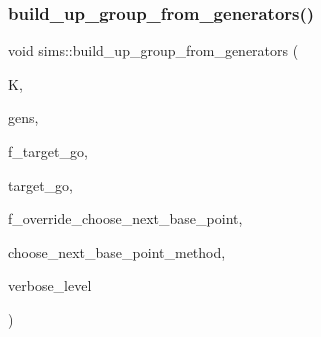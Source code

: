 \subsubsection{\texorpdfstring{build\+\_\+up\+\_\+group\+\_\+from\+\_\+generators()}{build\_up\_group\_from\_generators()}}
{\footnotesize\ttfamily void sims\+::build\+\_\+up\+\_\+group\+\_\+from\+\_\+generators (\begin{DoxyParamCaption}\item[{\mbox{\hyperlink{classsims}{sims}} $\ast$}]{K,  }\item[{\mbox{\hyperlink{classvector__ge}{vector\+\_\+ge}} $\ast$}]{gens,  }\item[{\mbox{\hyperlink{galois_8h_a09fddde158a3a20bd2dcadb609de11dc}{I\+NT}}}]{f\+\_\+target\+\_\+go,  }\item[{\mbox{\hyperlink{classlonginteger__object}{longinteger\+\_\+object}} $\ast$}]{target\+\_\+go,  }\item[{\mbox{\hyperlink{galois_8h_a09fddde158a3a20bd2dcadb609de11dc}{I\+NT}}}]{f\+\_\+override\+\_\+choose\+\_\+next\+\_\+base\+\_\+point,  }\item[{\mbox{\hyperlink{galois_8h_a09fddde158a3a20bd2dcadb609de11dc}{I\+NT}}($\ast$)(\mbox{\hyperlink{classaction}{action}} $\ast$\mbox{\hyperlink{classsims_a3311c97dc08837220191985b1c7ee73f}{A}}, \mbox{\hyperlink{galois_8h_a09fddde158a3a20bd2dcadb609de11dc}{I\+NT}} $\ast$\mbox{\hyperlink{simeon_8_c_aec1406935bdb1fee3561fcb840964100}{Elt}}, \mbox{\hyperlink{galois_8h_a09fddde158a3a20bd2dcadb609de11dc}{I\+NT}} \mbox{\hyperlink{simeon_8_c_a818073fbcc2f439e7c56952f67386122}{verbose\+\_\+level}})}]{choose\+\_\+next\+\_\+base\+\_\+point\+\_\+method,  }\item[{\mbox{\hyperlink{galois_8h_a09fddde158a3a20bd2dcadb609de11dc}{I\+NT}}}]{verbose\+\_\+level }\end{DoxyParamCaption})}

\mbox{\label{classsims_afde54d656304b5a92459615f2690ea64}} 
